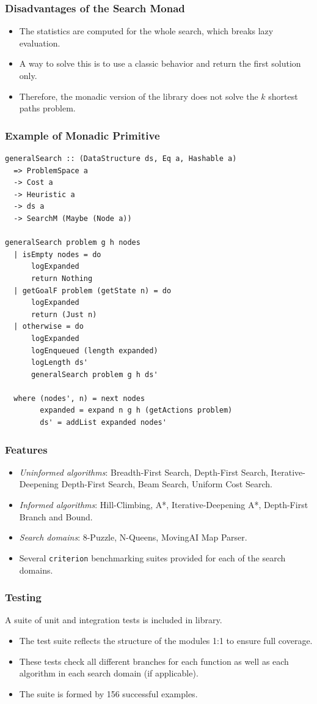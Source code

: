 \documentclass{beamer}
\begin{document}
\begin{frame}
  \frametitle{Disadvantages of the Search Monad}
  \begin{itemize}
  \item The statistics are computed for the whole search, which breaks lazy
    evaluation.
  \item A way to solve this is to use a classic behavior and return the first
    solution only.
  \item Therefore, the monadic version of the library does not solve the $k$
    shortest paths problem.
  \end{itemize}
\end{frame}

\begin{frame}[fragile]
  \frametitle{Example of Monadic Primitive}
\begin{lstlisting}[style=haskell]
generalSearch :: (DataStructure ds, Eq a, Hashable a)
  => ProblemSpace a
  -> Cost a
  -> Heuristic a
  -> ds a
  -> SearchM (Maybe (Node a))

generalSearch problem g h nodes
  | isEmpty nodes = do
      logExpanded
      return Nothing
  | getGoalF problem (getState n) = do
      logExpanded
      return (Just n)
  | otherwise = do
      logExpanded
      logEnqueued (length expanded)
      logLength ds'
      generalSearch problem g h ds'

  where (nodes', n) = next nodes
        expanded = expand n g h (getActions problem)
        ds' = addList expanded nodes'
\end{lstlisting}
\end{frame}

\begin{frame}
  \frametitle{Features}
  \begin{itemize}
  \item \emph{Uninformed algorithms}: Breadth-First Search, Depth-First Search,
    Iterative-Deepening Depth-First Search, Beam Search, Uniform Cost Search.
  \item \emph{Informed algorithms}: Hill-Climbing, A*, Iterative-Deepening A*,
    Depth-First Branch and Bound.
  \item \emph{Search domains}: 8-Puzzle, N-Queens, MovingAI Map Parser.
  \item Several \texttt{criterion} benchmarking suites provided for each of the
    search domains.
  \end{itemize}
\end{frame}

\begin{frame}
  \frametitle{Testing}
  A suite of unit and integration tests is included in library.
  \begin{itemize}
  \item The test suite reflects the structure of the modules 1:1 to ensure full
    coverage.
  \item These tests check all different branches for each function as well as
    each algorithm in each search domain (if applicable).
  \item The suite is formed by 156 successful examples.
  \end{itemize}
\end{frame}
\end{document}
